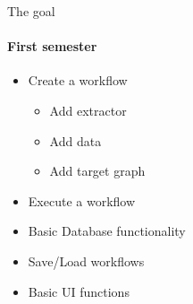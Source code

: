 \begin{frame}{The goal}
\framesubtitle{First semester}
	\begin{itemize}
		\item Create a workflow
		\begin{itemize}
			\item Add extractor
			\item Add data
			\item Add target graph
		\end{itemize}
		\item Execute a workflow
		\item Basic Database functionality
		\item Save/Load workflows
		\item Basic UI functions
	\end{itemize}
\end{frame}